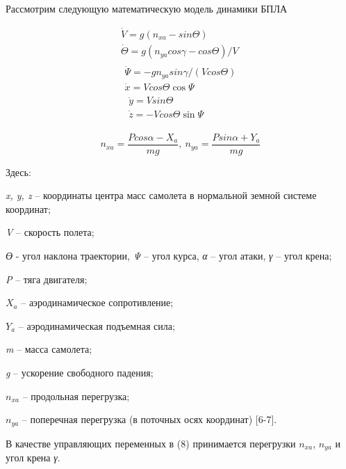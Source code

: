 Рассмотрим следующую математическую модель динамики БПЛА


\begin{equation}
\begin{matrix}
\dot{V} = g(n_{xa} - sin\Theta) \\
\dot{\Theta} = g(n_{ya}cos\gamma - cos\Theta)/V \\
\begin{matrix}
\dot{\Psi} = - gn_{ya}sin\gamma/(Vcos\Theta) \\
\dot{x} = Vcos\Theta\cos\Psi \\
\begin{matrix}
\dot{y} = Vsin\Theta \\
\dot{z} = - Vcos\Theta\sin\Psi
\end{matrix}
\end{matrix}
\end{matrix} 
\end{equation} 


\begin{equation}
n_{xa} = \frac{Pcos\alpha - X_{a}}{mg},\ n_{ya} = \frac{Psin\alpha + Y_{a}}{mg}
\end{equation} 

\begin{multicols}{2}

Здесь:

\emph{x, y, z} -- координаты центра масс самолета в нормальной земной
системе координат;

\emph{V} -- скорость полета;

\emph{ϴ} - угол наклона траектории, \emph{Ψ} -- угол курса, \emph{α} --
угол атаки, \emph{γ} -- угол крена;

\emph{P} -- тяга двигателя;

\(X_{a}\) -- аэродинамическое сопротивление;

\(Y_{a}\) -- аэродинамическая подъемная сила;

\emph{m} -- масса самолета;

\emph{g} -- ускорение свободного падения;

\(n_{xa}\) -- продольная перегрузка;

\(n_{ya}\) -- поперечная перегрузка (в поточных осях координат)
{[}6-7{]}.

В качестве управляющих переменных в (8) принимается перегрузки
\(n_{xa}\), \(n_{ya}\) и угол крена \emph{γ}.

\end{multicols}

